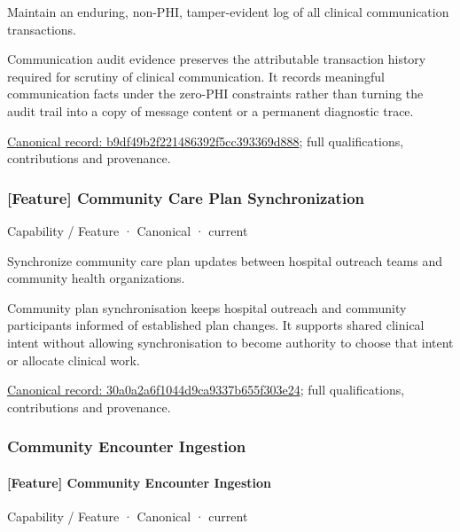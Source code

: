 Maintain an enduring, non-PHI, tamper-evident log of all clinical communication transactions.



Communication audit evidence preserves the attributable transaction history required for scrutiny of clinical communication. It records meaningful communication facts under the zero-PHI constraints rather than turning the audit trail into a copy of message content or a permanent diagnostic trace.


{\footnotesize \href{../../../../continuum/strategy/capability/feature/b9df49b2f221486392f5cc393369d888.md}{Canonical record: b9df49b2f221486392f5cc393369d888}; full qualifications, contributions and provenance.}\par
\subsubsection{[Feature] Community Care Plan Synchronization}

\label{element:30a0a2a6f1044d9ca9337b655f303e24}
{\small Capability / Feature · Canonical · current}\par

Synchronize community care plan updates between hospital outreach teams and community health organizations.



Community plan synchronisation keeps hospital outreach and community participants informed of established plan changes. It supports shared clinical intent without allowing synchronisation to become authority to choose that intent or allocate clinical work.


{\footnotesize \href{../../../../continuum/strategy/capability/feature/30a0a2a6f1044d9ca9337b655f303e24.md}{Canonical record: 30a0a2a6f1044d9ca9337b655f303e24}; full qualifications, contributions and provenance.}\par
\subsubsection{Community Encounter Ingestion}

\paragraph{[Feature] Community Encounter Ingestion}

\label{element:7afe8ae69ed7491192d884576ca0dc15}
{\small Capability / Feature · Canonical · current}\par

